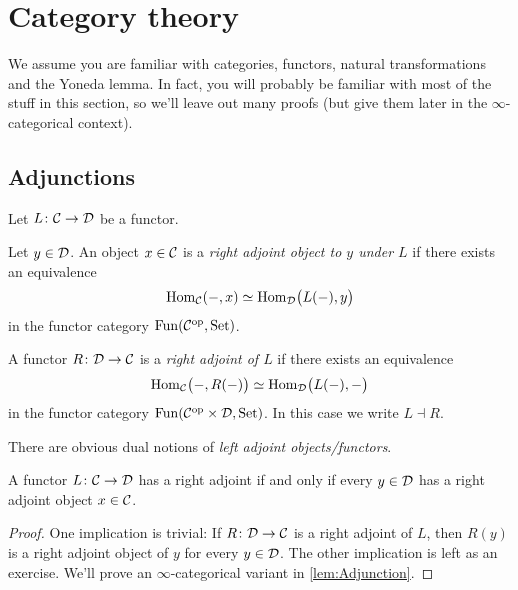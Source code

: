 \newcommand{\ho}{h} %

\section{Category theory}\label{sec:CategoryTheory}
We assume you are familiar with categories, functors, natural transformations and the Yoneda lemma. In fact, you will probably be familiar with most of the stuff in this section, so we'll leave out many proofs (but give them later in the $\infty$-categorical context).

\subsection{Adjunctions}
\begin{defi}\label{def:1Adjunction}
	Let $L\colon \mathcal{C}\rightarrow \mathcal{D}$ be a functor.
	\begin{alphanumerate}
		\item Let $y\in \mathcal{D}$. An object $x\in \mathcal{C}$ is a \emph{right adjoint object to $y$ under $L$} if there exists an equivalence
		\begin{equation*}
			\operatorname{Hom}_{\mathcal{C}}(-,x)\simeq \operatorname{Hom}_{\mathcal{D}}\bigl(L(-),y\bigr)
		\end{equation*}
		in the functor category $\operatorname{Fun}(\mathcal{C}^{\mathrm{op}},\mathrm{Set})$.
		\item A functor $R\colon \mathcal{D}\rightarrow \mathcal{C}$ is a \emph{right adjoint of $L$} if there exists an equivalence
		\begin{equation*}
			\operatorname{Hom}_{\mathcal{C}}\bigl(-,R(-)\bigr)\simeq \operatorname{Hom}_{\mathcal{D}} \bigl(L(-),-\bigr)
		\end{equation*}
		in the functor category $\operatorname{Fun}(\mathcal{C}^{\mathrm{op}}\times \mathcal{D},\mathrm{Set})$. In this case we write $L\dashv R$.
	\end{alphanumerate}
	There are obvious dual notions of \emph{left adjoint objects/functors}.
\end{defi}
\begin{lem}\label{lem:1Adjunction}
	A functor $L\colon \mathcal{C}\rightarrow \mathcal{D}$ has a right adjoint if and only if every $y\in \mathcal{D}$ has a right adjoint object $x\in \mathcal{C}$.
\end{lem}
\begin{proof}
	One implication is trivial: If $R\colon \mathcal{D}\rightarrow \mathcal{C}$ is a right adjoint of $L$, then $R(y)$ is a right adjoint object of $y$ for every $y\in \mathcal{D}$. The other implication is left as an exercise. We'll prove an $\infty$-categorical variant in \cref{lem:Adjunction}.
\end{proof}
